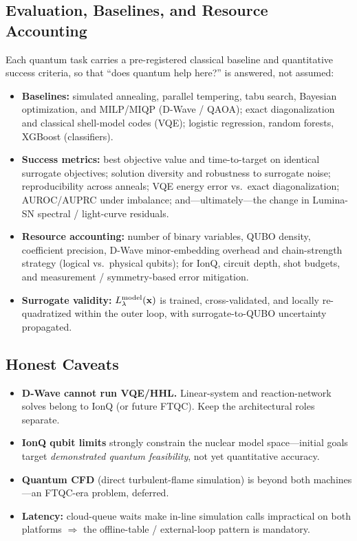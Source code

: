 \documentclass[11pt]{article}
\begin{document}
\subsection{Evaluation, Baselines, and Resource Accounting}
Each quantum task carries a pre-registered classical baseline and quantitative success criteria, so
that ``does quantum help here?'' is answered, not assumed:
\begin{itemize}
\item \textbf{Baselines:} simulated annealing, parallel tempering, tabu search, Bayesian
optimization, and MILP/MIQP (D-Wave / QAOA); exact diagonalization and classical shell-model codes
(VQE); logistic regression, random forests, XGBoost (classifiers).
\item \textbf{Success metrics:} best objective value and time-to-target on identical surrogate
objectives; solution diversity and robustness to surrogate noise; reproducibility across anneals;
VQE energy error vs.\ exact diagonalization; AUROC/AUPRC under imbalance; and---ultimately---the
change in Lumina-SN spectral / light-curve residuals.
\item \textbf{Resource accounting:} number of binary variables, QUBO density, coefficient precision,
D-Wave minor-embedding overhead and chain-strength strategy (logical vs.\ physical qubits); for IonQ,
circuit depth, shot budgets, and measurement / symmetry-based error mitigation.
\item \textbf{Surrogate validity:} $L_\lambda^{\rm model}(\mathbf{x})$ is trained, cross-validated,
and locally re-quadratized within the outer loop, with surrogate-to-QUBO uncertainty propagated.
\end{itemize}

\subsection{Honest Caveats}
\begin{cautionbox}
\begin{itemize}
\item \textbf{D-Wave cannot run VQE/HHL.} Linear-system and reaction-network solves belong to IonQ
(or future FTQC). Keep the architectural roles separate.
\item \textbf{IonQ qubit limits} strongly constrain the nuclear model space---initial goals target
\emph{demonstrated quantum feasibility}, not yet quantitative accuracy.
\item \textbf{Quantum CFD} (direct turbulent-flame simulation) is beyond both machines---an FTQC-era
problem, deferred.
\item \textbf{Latency:} cloud-queue waits make in-line simulation calls impractical on both
platforms $\Rightarrow$ the offline-table / external-loop pattern is mandatory.
\end{itemize}
\end{cautionbox}
\end{document}
